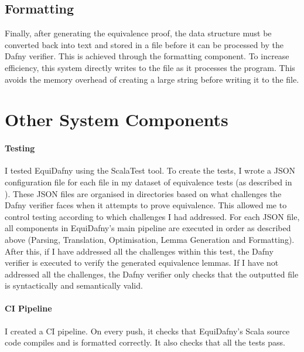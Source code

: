 \subsection{Formatting}

Finally, after generating the equivalence proof, the data structure must be converted back into text and stored in a file before it can be processed by the Dafny verifier. This is achieved through the formatting component. To increase efficiency, this system directly writes to the file as it processes the program. This avoids the memory overhead of creating a large string before writing it to the file. 

\section{Other System Components}

\paragraph{Testing} I tested EquiDafny using the ScalaTest tool. To create the tests, I wrote a JSON configuration file for each file in my dataset of equivalence tests (as described in ). These JSON files are organised in directories based on what challenges the Dafny verifier faces when it attempts to prove equivalence. This allowed me to control testing according to which challenges I had addressed. For each JSON file, all components in EquiDafny's main pipeline are executed in order as described above (Parsing, Translation, Optimisation, Lemma Generation and Formatting). After this, if I have addressed all the challenges within this test, the Dafny verifier is executed to verify the generated equivalence lemmas. If I have not addressed all the challenges, the Dafny verifier only checks that the outputted file is syntactically and semantically valid.

\paragraph{CI Pipeline} I created a CI pipeline. On every push, it checks that EquiDafny's Scala source code compiles and is formatted correctly. It also checks that all the tests pass. 
